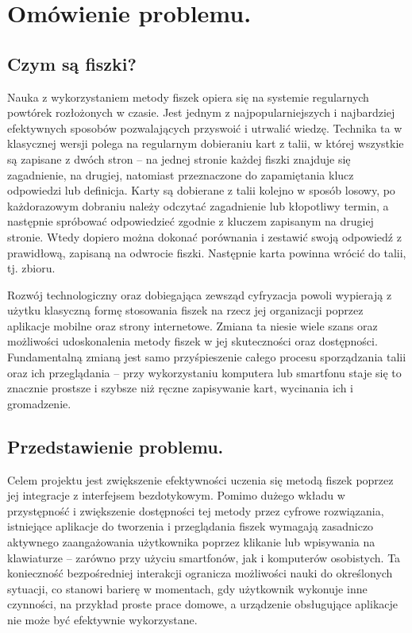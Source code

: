 \chapter{Omówienie problemu.}

\section{Czym są fiszki?}

Nauka z wykorzystaniem metody fiszek opiera się na systemie regularnych powtórek rozłożonych w czasie. Jest jednym z najpopularniejszych i najbardziej efektywnych sposobów pozwalających przyswoić i utrwalić wiedzę. Technika ta w klasycznej wersji polega na regularnym dobieraniu kart z talii, w której wszystkie są zapisane z dwóch stron – na jednej stronie każdej fiszki znajduje się zagadnienie, na drugiej, natomiast przeznaczone do zapamiętania klucz odpowiedzi lub definicja. Karty są dobierane z talii kolejno w sposób losowy, po każdorazowym dobraniu należy odczytać zagadnienie lub kłopotliwy termin, a następnie spróbować odpowiedzieć zgodnie z kluczem zapisanym na drugiej stronie. Wtedy dopiero można dokonać porównania i zestawić swoją odpowiedź z prawidłową, zapisaną na odwrocie fiszki. Następnie karta powinna wrócić do talii, tj. zbioru.

Rozwój technologiczny oraz dobiegająca zewsząd cyfryzacja powoli wypierają z użytku klasyczną formę stosowania fiszek na rzecz jej organizacji poprzez aplikacje mobilne oraz strony internetowe. Zmiana ta niesie wiele szans oraz możliwości udoskonalenia metody fiszek w jej skuteczności oraz dostępności. Fundamentalną zmianą jest samo przyśpieszenie całego procesu sporządzania talii oraz ich przeglądania – przy wykorzystaniu komputera lub smartfonu staje się to znacznie prostsze i szybsze niż ręczne zapisywanie kart, wycinania ich i gromadzenie.

\section{Przedstawienie problemu.}

Celem projektu jest zwiększenie efektywności uczenia się metodą fiszek poprzez jej integracje z interfejsem bezdotykowym. Pomimo dużego wkładu w przystępność i zwiększenie dostępności tej metody przez cyfrowe rozwiązania, istniejące aplikacje do tworzenia i przeglądania fiszek wymagają zasadniczo aktywnego zaangażowania użytkownika poprzez klikanie lub wpisywania na klawiaturze – zarówno przy użyciu smartfonów, jak i komputerów osobistych. Ta konieczność bezpośredniej interakcji ogranicza możliwości nauki do określonych sytuacji, co stanowi barierę w momentach, gdy użytkownik wykonuje inne czynności, na przykład proste prace domowe, a urządzenie obsługujące aplikacje nie może być efektywnie wykorzystane.

